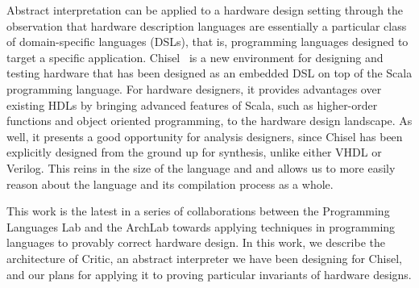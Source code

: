 \documentclass[10pt,conference]{IEEEtran}
\begin{document}
Abstract interpretation can be applied to a hardware design setting through
the observation that hardware description languages are essentially a particular
class of
domain-specific languages (DSLs), that is, programming languages designed to target
a specific application. Chisel~\cite{asanovic12} is a new environment for
designing and testing hardware that has been designed as an embedded DSL on top
of the Scala programming language. For hardware designers, it provides
advantages over existing HDLs by bringing advanced features of Scala, such
as higher-order functions and object oriented programming, to the hardware
design landscape. As well, it presents a good opportunity for analysis designers,
since Chisel has been explicitly designed from the ground up for synthesis, 
unlike either VHDL or Verilog. This reins in the size of the language and 
and allows us to more easily reason about the language and its compilation process
as a whole.

This work is the latest in a series of collaborations between the Programming Languages
Lab and the ArchLab towards applying techniques in programming languages to provably
correct hardware design. In this work, we describe the architecture of Critic, an abstract
interpreter we have been designing for Chisel, and our plans for applying it to proving
particular invariants of hardware designs.

%
%

\end{document}
